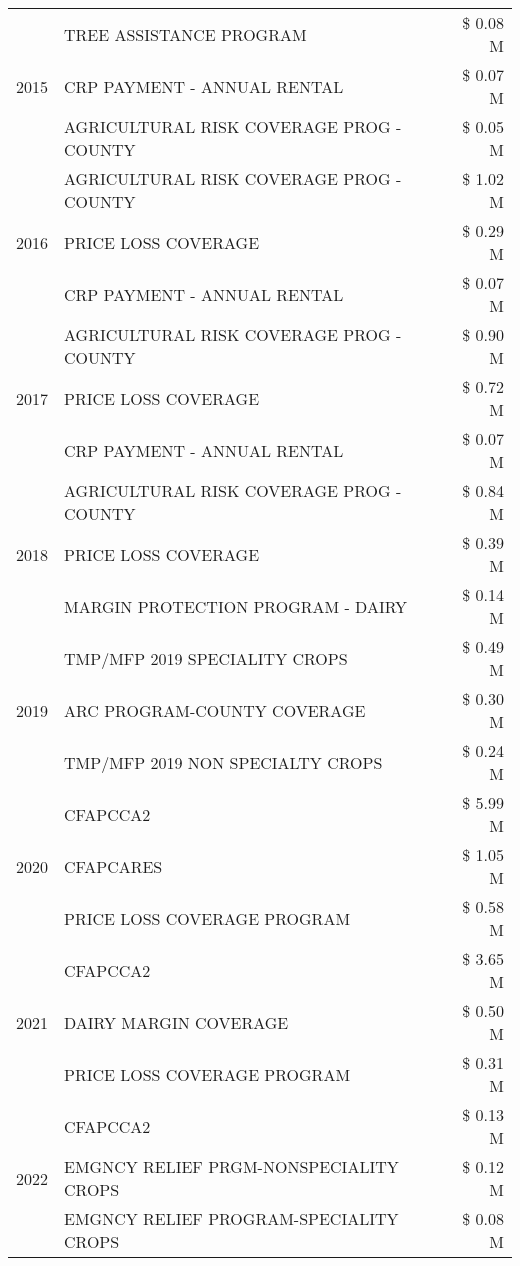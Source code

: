 \begin{tabular}{llr}
\cline{1-3}
\multirow[t]{3}{*}{2015} & TREE ASSISTANCE PROGRAM & \$ 0.08 M \\
 & CRP PAYMENT - ANNUAL RENTAL & \$ 0.07 M \\
 & AGRICULTURAL RISK COVERAGE PROG - COUNTY & \$ 0.05 M \\
\cline{1-3}
\multirow[t]{3}{*}{2016} & AGRICULTURAL RISK COVERAGE PROG - COUNTY & \$ 1.02 M \\
 & PRICE LOSS COVERAGE & \$ 0.29 M \\
 & CRP PAYMENT - ANNUAL RENTAL & \$ 0.07 M \\
\cline{1-3}
\multirow[t]{3}{*}{2017} & AGRICULTURAL RISK COVERAGE PROG - COUNTY & \$ 0.90 M \\
 & PRICE LOSS COVERAGE & \$ 0.72 M \\
 & CRP PAYMENT - ANNUAL RENTAL & \$ 0.07 M \\
\cline{1-3}
\multirow[t]{3}{*}{2018} & AGRICULTURAL RISK COVERAGE PROG - COUNTY & \$ 0.84 M \\
 & PRICE LOSS COVERAGE & \$ 0.39 M \\
 & MARGIN PROTECTION PROGRAM - DAIRY & \$ 0.14 M \\
\cline{1-3}
\multirow[t]{3}{*}{2019} & TMP/MFP 2019 SPECIALITY CROPS & \$ 0.49 M \\
 & ARC PROGRAM-COUNTY COVERAGE & \$ 0.30 M \\
 & TMP/MFP 2019 NON SPECIALTY CROPS & \$ 0.24 M \\
\cline{1-3}
\multirow[t]{3}{*}{2020} & CFAPCCA2 & \$ 5.99 M \\
 & CFAPCARES & \$ 1.05 M \\
 & PRICE LOSS COVERAGE PROGRAM & \$ 0.58 M \\
\cline{1-3}
\multirow[t]{3}{*}{2021} & CFAPCCA2 & \$ 3.65 M \\
 & DAIRY MARGIN COVERAGE & \$ 0.50 M \\
 & PRICE LOSS COVERAGE PROGRAM & \$ 0.31 M \\
\cline{1-3}
\multirow[t]{3}{*}{2022} & CFAPCCA2 & \$ 0.13 M \\
 & EMGNCY RELIEF PRGM-NONSPECIALITY CROPS & \$ 0.12 M \\
 & EMGNCY RELIEF PROGRAM-SPECIALITY CROPS & \$ 0.08 M \\
\cline{1-3}
\bottomrule
\end{tabular}
